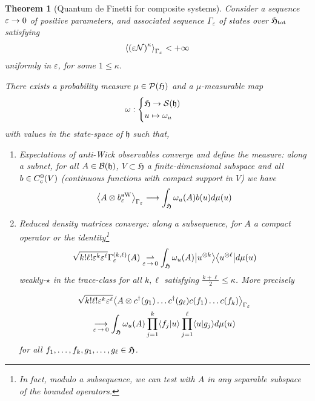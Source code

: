 \documentclass[10pt]{amsart}
\newtheorem{theo}{Theorem}[section]
\theoremstyle{definition}\newtheorem{defi}[theo]{Definition}\newtheorem{rema}[theo]{Remark}\newtheorem{exam}[theo]{Example}\newtheorem{exem}[theo]{Example}\newtheorem{nota}[theo]{Notation}
\newcommand{\wto}{\rightharpoonup}
\newcommand{\cS}{\mathcal{S}}
\newcommand{\cN}{\mathcal{N}}
\newcommand{\gH}{\mathfrak{H}}
\newcommand{\gh}{\mathfrak{h}}
\newcommand{\cB}{\mathcal{B}}
\newcommand{\cP}{\mathcal{P}}
\newcommand{\1}{\mathds{1}}
\newcommand{\eps}{\varepsilon}
\newcommand{\cda}{c^{\dagger}}
\newcommand{\gHt}{\mathfrak{H}_{\rm tot}}
\let\oldin\in
\renewcommand{\in}{\mathchoice{\oldin}{\oldin}{\,\oldin\,}{\,\oldin\,}}
\renewcommand*{\to}{\mathchoice{\longrightarrow}{\rightarrow}{\rightarrow}{\rightarrow}}
\let\oldmapsto\mapsto
\renewcommand*{\mapsto}{\mathchoice{\longmapsto}{\oldmapsto}{\oldmapsto}{\oldmapsto}}
\let\originalleft\left
\let\originalright\right
\renewcommand{\left}{\mathopen{}\mathclose\bgroup\originalleft}
\renewcommand{\right}{\aftergroup\egroup\originalright}
\begin{document}
\begin{theo}[{Quantum de Finetti for composite systems}]\label{thm:deF comp}
Consider a sequence $\eps \to 0$ of positive parameters, and associated sequence $\Gamma_\eps$ of states over $\gHt$ satisfying
\begin{equation}\label{eq:control_N}
\left\langle \left(\eps \cN \right)^\kappa \right\rangle_{\Gamma_{\eps}} < + \infty 
\end{equation}
uniformly in $\eps$, for some $1 \leq \kappa$.

There exists a probability measure $\mu \in \cP (\gH)$ and a $\mu$-measurable map
\begin{equation*}
\omega :
\begin{cases}
\gH \to \cS (\gh)\\
u \mapsto \omega_u
\end{cases}
\end{equation*}
with values in the state-space of $\gh$ such that,
\begin{enumerate}
\item\label{theo4.3.1} Expectations of anti-Wick observables converge and define the measure: along a subnet, for all $A\in \cB(\gh)$, $V \subset \gH$ a finite-dimensional subspace and all $b\in C^0_c (V)$ (continuous functions with compact support in $V$) we have
\begin{equation}\label{eq:AW CV comp}
\left\langle A \otimes b^{\rm aW}_{\eps} \right\rangle_{\Gamma_\eps} \to \int_{ \gH} \omega_u (A) b(u) d\mu (u)
\end{equation}
\item\label{theo4.3.2} Reduced density matrices converge: along a subsequence, for $A$ a compact operator or the identity\footnote{In fact, modulo a subsequence, we can test with $A$ in any separable subspace of the bounded operators.}
\begin{equation}\label{eq:CV DM comp}
\sqrt{k! \ell ! \eps^k \eps^\ell}\Gamma_\eps^{(k,\ell)} (A)
\underset{\eps\,\to\,0}{\wto} \int_{\gH} \omega_u (A) \left|u^{\otimes k} \right\rangle \left\langle u^{\otimes \ell}\right| d\mu (u)
\end{equation}
weakly-$\star$ in the trace-class for all $k,\ell$ satisfying $\frac{k+\ell}{2} \leq \kappa$. More precisely

\goodbreak 
\pagebreak
\begin{multline*}
\sqrt{k! \ell ! \eps ^k \eps^\ell}\left\langle A \otimes \cda (g_1) \ldots \cda (g_\ell) c (f_1) \ldots c(f_k) \right\rangle_{\Gamma_{\eps}}\\
\underset{\eps\,\to\,0}{\to} \int_{\gH} \omega_u (A) \prod_{j=1} ^k \langle f_j | u \rangle \prod_{j=1}^\ell \langle u | g_j \rangle d\mu (u)
\end{multline*}
for all $f_1,\ldots,f_k,g_1,\ldots,g_\ell \in \gH$.
\end{enumerate}
\end{theo}
\end{document}
